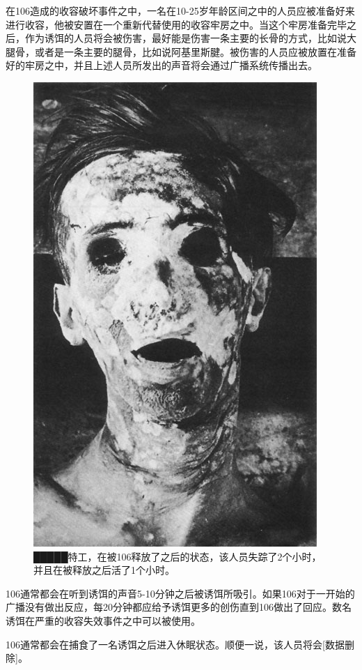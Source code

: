 
在106造成的收容破坏事件之中，一名在10-25岁年龄区间之中的人员应被准备好来进行收容，他被安置在一个重新代替使用的收容牢房之中。当这个牢房准备完毕之后，作为诱饵的人员将会被伤害，最好能是伤害一条主要的长骨的方式，比如说大腿骨，或者是一条主要的腿骨，比如说阿基里斯腱。被伤害的人员应被放置在准备好的牢房之中，并且上述人员所发出的声音将会通过广播系统传播出去。

\begin{figure}[H]
    \centering
    \includegraphics[width=0.5\linewidth]{images/SCP-106-4.jpg}
    \caption*{█████特工，在被106释放了之后的状态，该人员失踪了2个小时，并且在被释放之后活了1个小时。}
\end{figure}

106通常都会在听到诱饵的声音5-10分钟之后被诱饵所吸引。如果106对于一开始的广播没有做出反应，每20分钟都应给予诱饵更多的创伤直到106做出了回应。数名诱饵在严重的收容失效事件之中可以被使用。

106通常都会在捕食了一名诱饵之后进入休眠状态。顺便一说，该人员将会{[}数据删除]。
